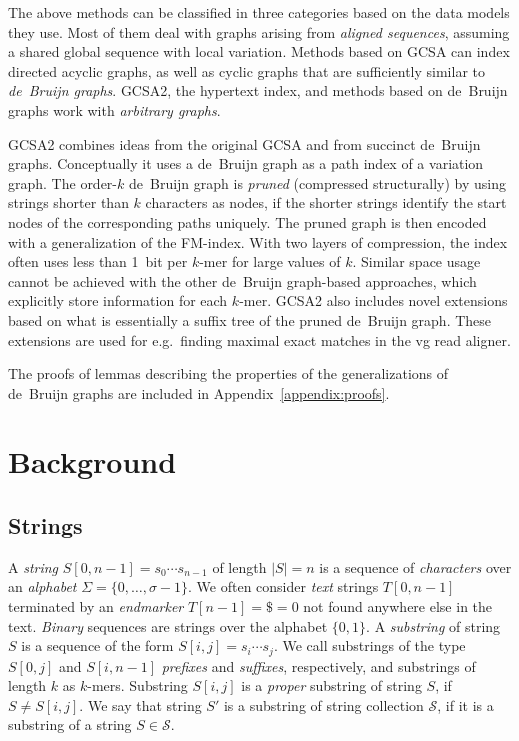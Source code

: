\documentclass[a4paper,UKenglish]{lipics-v2016}
\newcommand{\set}[1]{\ensuremath{\{ #1 \}}}
\newcommand{\abs}[1]{\ensuremath{\lvert #1 \rvert}}
\newcommand{\kmer}[1]{$#1$\nobreakdash-mer}
\newcommand{\orderk}[1]{order\nobreakdash-$#1$}
\begin{document}
The above methods can be classified in three categories based on the data models they use. Most of them deal with graphs arising from \emph{aligned sequences}, assuming a shared global sequence with local variation. Methods based on GCSA can index directed acyclic graphs, as well as cyclic graphs that are sufficiently similar to \emph{de~Bruijn graphs}. GCSA2, the hypertext index, and methods based on de~Bruijn graphs work with \emph{arbitrary graphs}.

GCSA2 combines ideas from the original GCSA and from succinct de~Bruijn graphs. Conceptually it uses a de~Bruijn graph as a path index of a variation graph. The \orderk{k} de~Bruijn graph is \emph{pruned} (compressed structurally) by using strings shorter than $k$ characters as nodes, if the shorter strings identify the start nodes of the corresponding paths uniquely. The pruned graph is then encoded with a generalization of the FM\nobreakdash-index. With two layers of compression, the index often uses less than 1~bit per \kmer{k} for large values of $k$. Similar space usage cannot be achieved with the other de~Bruijn graph-based approaches, which explicitly store information for each \kmer{k}. GCSA2 also includes novel extensions based on what is essentially a suffix tree of the pruned de~Bruijn graph. These extensions are used for e.g.~finding maximal exact matches in the vg read aligner.

The proofs of lemmas describing the properties of the generalizations of de~Bruijn graphs are included in Appendix~\ref{appendix:proofs}.


\section{Background}

\subsection{Strings}\label{sect:strings}

A \emph{string} $S[0, n-1] = s_{0} \dotsm s_{n-1}$ of length $\abs{S} = n$ is a sequence of \emph{characters} over an \emph{alphabet} $\Sigma = \set{0, \dotsc, \sigma - 1}$. We often consider \emph{text} strings $T[0, n-1]$ terminated by an \emph{endmarker} $T[n-1] = \$ = 0$ not found anywhere else in the text. \emph{Binary} sequences are strings over the alphabet $\set{0, 1}$. A \emph{substring} of string $S$ is a sequence of the form $S[i, j] = s_{i} \dotsm s_{j}$. We call substrings of the type $S[0, j]$ and $S[i, n-1]$ \emph{prefixes} and \emph{suffixes}, respectively, and substrings of length $k$ as \kmer{k}s. Substring $S[i, j]$ is a \emph{proper} substring of string $S$, if $S \ne S[i, j]$. We say that string $S'$ is a substring of string collection $\mathcal{S}$, if it is a substring of a string $S \in \mathcal{S}$.
\end{document}
